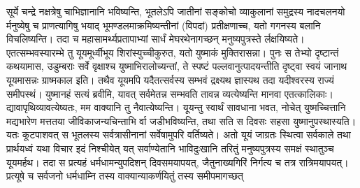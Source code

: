 \vakya सूर्ये चन्द्रे नक्षत्रेषु चाभिज्ञानानि भविष्यन्ति, भूतलेऽपि जातीनां सङ्कोचो व्याकुलानां समुद्रस्य नादचलनयो र्मनुष्येषु च
\vakya प्राणत्यागिषु भयाद् भूमण्डलमाक्रमिष्यन्तीनां (विपदां) प्रतीक्षणाच्च, यतो गगनस्य बलानि विचलिष्यन्ति।
\vakya तदा च महासामर्थ्यप्रतापाभ्यां सार्धं मेघरथेनागच्छन् मनुष्यपुत्रस्ते र्लक्षयिष्यते।
\vakya एतत्सम्भवस्यारम्भे तु यूयमूर्ध्वीभूय शिरांस्युच्चीकुरुत, यतो युष्माकं मुक्तिरासन्ना।
\vakya पुनः स तेभ्यो दृष्टान्तं कथयामास, उडुम्बराः सर्वे वृक्षाश्च युष्माभिरालोच्यन्तां,
\vakya ते स्पष्टं पल्लवानुत्पादयन्तीति दृष्ट्वा स्वयं जानाथ यूयमासन्नः ग्राष्मकाल इति।
\vakya तथैव यूयमपि यदैतत्सर्वस्य सम्भवं द्रक्ष्यथ ज्ञास्यथ तदा यदीश्वरस्य राज्यं समीपस्थं।
\vakya युष्मानहं सत्यं ब्रवीमि, यावत् सर्वमेतन्न सम्भवति तावन्न व्यत्येष्यन्ति मानवा एतत्कालिकाः।
\vakya द्यावापृथिव्यावत्येष्यतः, मम वाक्यानि तु नैवात्येष्यन्ति।
\vakya यूयन्तु स्वार्थं सावधाना भवत, नोचेत् युष्मच्चित्तानि मद्यभारेण मत्ततया जीविकाजन्यचिन्ताभि र्वा जडीभविष्यन्ति, तथा सति स दिवसः सहसा युष्मानुपस्थास्यति।
\vakya यतः कूटपाशवत् स भूतलस्य सर्वत्रासीनानां सर्वेषामुपरि वर्तिष्यते।
\vakya अतो यूयं जाग्रतः स्थित्वा सर्वकाले तथा प्रार्थयध्वं यथा विचार इदं निश्चीयेत् यत् सर्वाण्येतानि भाविदुःखानि तरितुं मनुष्यपुत्रस्य समक्षं स्थातुञ्च यूयमर्हथ।
\vakya तदा स प्रत्यहं धर्मधामन्युपदिशन् दिवसमयापयत्, जैतुनाख्यगिरिं निर्गत्य च तत्र रात्रिमयापयत्।
\vakya प्रत्यूषे च सर्वजनो धर्मधाम्नि तस्य वाक्यान्याकर्णयितुं तस्य समीपमागच्छत्\eoc